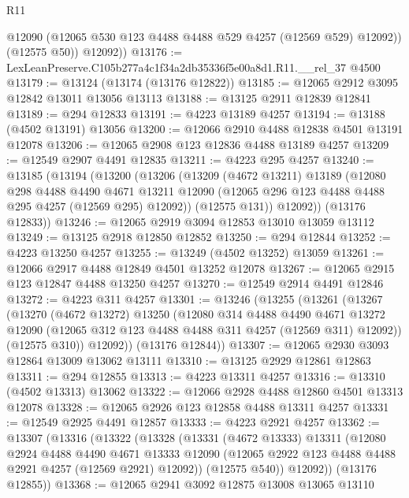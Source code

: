 \begin{lexlean}{R11}
\begin{coremodule}
            @12090
            (@12065 @530 @123 @4488 @4488 @529 @4257 (@12569 @529) @12092))
          (@12575 @50))
        @12092))
@13176 := LexLeanPreserve.C105b277a4c1f34a2db35336f5e00a8d1.R11.__rel_37 @4500
@13179 := @13124 (@13174 (@13176 @12822))
@13185 := @12065 @2912 @3095 @12842 @13011 @13056 @13113
@13188 := @13125 @2911 @12839 @12841
@13189 := @294 @12833
@13191 := @4223 @13189 @4257
@13194 := @13188 (@4502 @13191) @13056
@13200 := @12066 @2910 @4488 @12838 @4501 @13191 @12078
@13206 := @12065 @2908 @123 @12836 @4488 @13189 @4257
@13209 := @12549 @2907 @4491 @12835
@13211 := @4223 @295 @4257
@13240 := @13185
    (@13194
      (@13200
        (@13206
          (@13209
            (@4672 @13211)
            @13189
            (@12080
              @298
              @4488
              @4490
              @4671
              @13211
              @12090
              (@12065 @296 @123 @4488 @4488 @295 @4257 (@12569 @295) @12092))
            (@12575 @131))
          @12092))
      (@13176 @12833))
@13246 := @12065 @2919 @3094 @12853 @13010 @13059 @13112
@13249 := @13125 @2918 @12850 @12852
@13250 := @294 @12844
@13252 := @4223 @13250 @4257
@13255 := @13249 (@4502 @13252) @13059
@13261 := @12066 @2917 @4488 @12849 @4501 @13252 @12078
@13267 := @12065 @2915 @123 @12847 @4488 @13250 @4257
@13270 := @12549 @2914 @4491 @12846
@13272 := @4223 @311 @4257
@13301 := @13246
    (@13255
      (@13261
        (@13267
          (@13270
            (@4672 @13272)
            @13250
            (@12080
              @314
              @4488
              @4490
              @4671
              @13272
              @12090
              (@12065 @312 @123 @4488 @4488 @311 @4257 (@12569 @311) @12092))
            (@12575 @310))
          @12092))
      (@13176 @12844))
@13307 := @12065 @2930 @3093 @12864 @13009 @13062 @13111
@13310 := @13125 @2929 @12861 @12863
@13311 := @294 @12855
@13313 := @4223 @13311 @4257
@13316 := @13310 (@4502 @13313) @13062
@13322 := @12066 @2928 @4488 @12860 @4501 @13313 @12078
@13328 := @12065 @2926 @123 @12858 @4488 @13311 @4257
@13331 := @12549 @2925 @4491 @12857
@13333 := @4223 @2921 @4257
@13362 := @13307
    (@13316
      (@13322
        (@13328
          (@13331
            (@4672 @13333)
            @13311
            (@12080
              @2924
              @4488
              @4490
              @4671
              @13333
              @12090
              (@12065 @2922 @123 @4488 @4488 @2921 @4257 (@12569 @2921) @12092))
            (@12575 @540))
          @12092))
      (@13176 @12855))
@13368 := @12065 @2941 @3092 @12875 @13008 @13065 @13110

\end{coremodule}
\end{lexlean}
